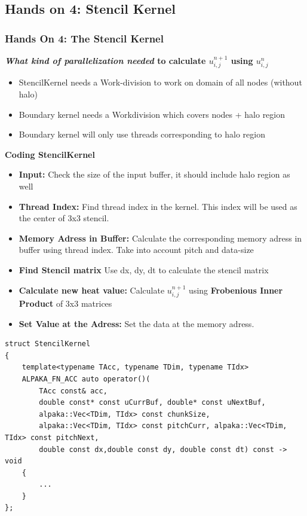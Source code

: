 \documentclass[9pt]{beamer}
\begin{document}
\subsection{Hands on 4: Stencil Kernel}
\begin{frame}[fragile]
\frametitle{Hands On 4: The Stencil Kernel}
\scriptsize
 \textbf{\textit{What kind of parallelization needed} to calculate  $u_{i,j}^{n+1}$ using $u_{i,j}^{n}$ }


    \begin{itemize}
        \item StencilKernel needs a Work-division to work on domain of all nodes (without halo)
        \item Boundary kernel needs a Workdivision which covers nodes + halo region
        \item Boundary kernel will only use threads corresponding to halo region
    \end{itemize}


\textbf{Coding StencilKernel }


    \begin{itemize}
    \item \textbf{Input:} Check the size of the input buffer, it should include halo region as well
    \item \textbf{Thread Index:} Find thread index in the kernel. This index will be used as the center of 3x3 stencil.
    \item \textbf{Memory Adress in Buffer:} Calculate the corresponding memory adress in buffer using thread index. Take into account pitch and data-size
    \item \textbf{Find Stencil matrix} Use dx, dy, dt to calculate the stencil matrix
    \item \textbf{Calculate new heat value:} Calculate $u_{i,j}^{n+1}$ using \textbf{Frobenious Inner Product} of 3x3 matrices
    \item \textbf{Set Value at the Adress:} Set the data at the memory adress.
    \end{itemize}
    \lstset{basicstyle=\ttfamily\tiny}
    \begin{lstlisting}
struct StencilKernel
{
    template<typename TAcc, typename TDim, typename TIdx>
    ALPAKA_FN_ACC auto operator()(
        TAcc const& acc,
        double const* const uCurrBuf, double* const uNextBuf,
        alpaka::Vec<TDim, TIdx> const chunkSize,
        alpaka::Vec<TDim, TIdx> const pitchCurr, alpaka::Vec<TDim, TIdx> const pitchNext,
        double const dx,double const dy, double const dt) const -> void
    {
        ...
    }
};
    \end{lstlisting}
\end{frame}
\end{document}
